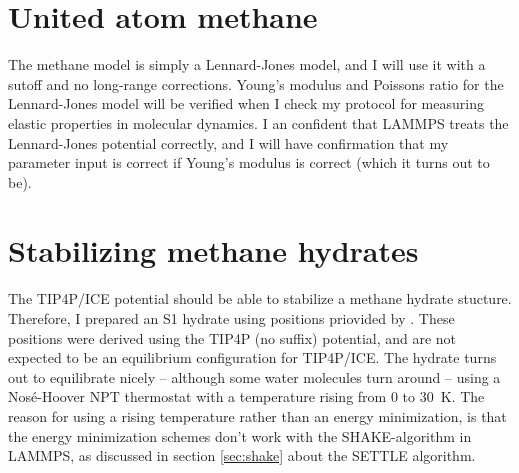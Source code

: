 \section{United atom methane}
The methane model is simply a Lennard-Jones model, and I will use it with a sutoff and no long-range corrections. Young's modulus and Poissons ratio for the Lennard-Jones model will be verified when I check my protocol for measuring elastic properties in molecular dynamics. I an confident that LAMMPS treats the Lennard-Jones potential correctly, and I will have confirmation that my parameter input is correct if Young's modulus is correct (which it turns out to be).

\section{Stabilizing methane hydrates}
The TIP4P/ICE potential should be able to stabilize a methane hydrate stucture. Therefore, I prepared an S1 hydrate using positions priovided by \citet{Takeuchi2013}. These positions were derived using the TIP4P (no suffix) potential, and are not expected to be an equilibrium configuration for TIP4P/ICE. The hydrate turns out to equilibrate nicely – although some water molecules turn around – using a Nosé-Hoover NPT thermostat with a temperature rising from $0$ to \SI{30}{\kelvin}. The reason for using a rising temperature rather than an energy minimization, is that the energy minimization schemes don't work with the SHAKE-algorithm in LAMMPS, as discussed in section \ref{sec:shake} about the SETTLE algorithm.

